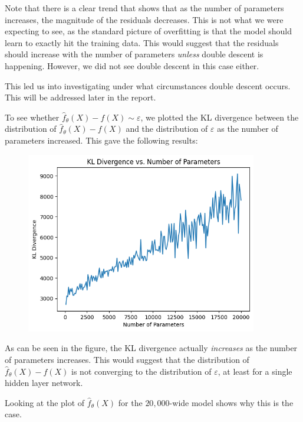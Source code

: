 \documentclass{article}
\begin{document}
Note that there is a clear trend that shows that as the number of parameters increases, the magnitude of the residuals decreases.
This is not what we were expecting to see, as the standard picture of overfitting is that the model should learn to exactly hit the training data.
This would suggest that the residuals should increase with the number of parameters \emph{unless} double descent is happening.
However, we did not see double descent in this case either.

This led us into investigating under what circumstances double descent occurs.
This will be addressed later in the report.

To see whether $\hat{f}_\theta(X) - f(X) \sim \varepsilon$, we plotted the KL divergence between the distribution of $\hat{f}_\theta(X) - f(X)$ and the distribution of $\varepsilon$ as the number of parameters increased.
This gave the following results:
\begin{figure}[H]
    \centering
    \includegraphics[width=0.9\textwidth]{figures/klwidth.png}
\end{figure}
As can be seen in the figure, the KL divergence actually \emph{increases} as the number of parameters increases.
This would suggest that the distribution of $\hat{f}_\theta(X) - f(X)$ is not converging to the distribution of $\varepsilon$, at least for a single hidden layer network.

Looking at the plot of $\hat{f}_\theta(X)$ for the $20,000$-wide model shows why this is the case.
\end{document}
